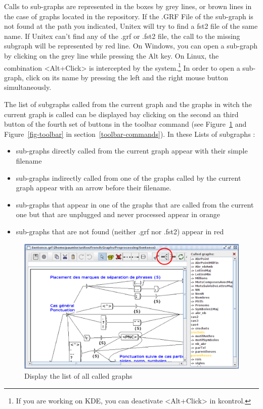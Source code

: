 \bigskip
\noindent Calls to sub-graphs are represented in the boxes by grey lines, or brown
lines in the case of graphs located in the repository. If the .GRF File of the sub-graph is not found at the path you indicated, Unitex will try to find a fst2 file of the same name. If Unitex can't find any of the .grf or .fst2 file, the call to the missing subgraph will be represented by red line. 
On Windows, you can open a sub-graph by clicking on the grey line while pressing the Alt key.
On Linux, the  combination <Alt+Click> is intercepted by the system.\footnote{If you are 
working on KDE, you can deactivate <Alt+Click> in kcontrol.} In order to open a
sub-graph, click on its name by pressing the left and the right mouse button
simultaneously.

\bigskip
\noindent The list of subgraphs called from the current graph and the graphs in witch the current graph is called can be displayed bay clicking on the second an third button of the fourth set of buttons in the toolbar command (see Figure~\ref{list-called-graphs} and
Figure~\ref{fig-toolbar} in section~\ref{toolbar-commands}).
In these Lists of subgraphs : 
\begin{itemize}
\item sub-graphs directly called from the current graph appear with their simple filename
\item sub-graphs indirectly called from one of the graphs called by the current graph appear with an arrow before their filename.
\item sub-graphs that appear in one of the graphs that are called from the current one but that are unplugged and never processed appear in orange
\item sub-graphs that are not found (neither .grf nor .fst2) appear in red
\end{itemize}

\begin{figure}[!h]
\begin{center}
\includegraphics[width=15.2cm]{resources/img/fig5-12b.png}
\caption{Display the list of all called graphs\label{list-called-graphs}}
\end{center}
\end{figure}

